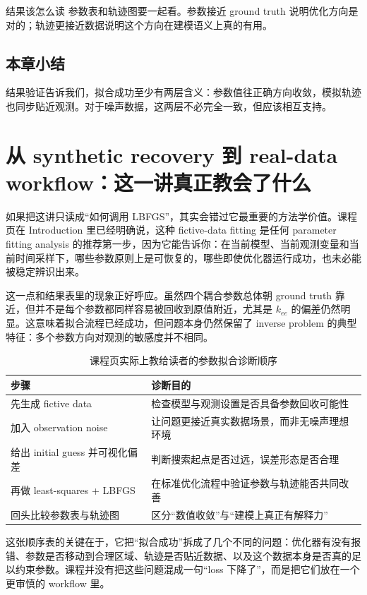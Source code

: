 \documentclass[a4paper]{article}
\begin{document}
\begin{knowledgebox}{结果该怎么读}
参数表和轨迹图要一起看。参数接近 ground truth 说明优化方向是对的；轨迹更接近数据说明这个方向在建模语义上真的有用。
\end{knowledgebox}

\subsection{本章小结}
结果验证告诉我们，拟合成功至少有两层含义：参数值往正确方向收敛，模拟轨迹也同步贴近观测。对于噪声数据，这两层不必完全一致，但应该相互支持。

\section{从 synthetic recovery 到 real-data workflow：这一讲真正教会了什么}
如果把这讲只读成“如何调用 LBFGS”，其实会错过它最重要的方法学价值。课程页在 Introduction 里已经明确说，这种 fictive-data fitting 是任何 parameter fitting analysis 的推荐第一步，因为它能告诉你：在当前模型、当前观测变量和当前时间采样下，哪些参数原则上是可恢复的，哪些即使优化器运行成功，也未必能被稳定辨识出来。

这一点和结果表里的现象正好呼应。虽然四个耦合参数总体朝 ground truth 靠近，但并不是每个参数都同样容易被回收到原值附近，尤其是 $k_{ee}$ 的偏差仍然明显。这意味着拟合流程已经成功，但问题本身仍然保留了 inverse problem 的典型特征：多个参数方向对观测的敏感度并不相同。

\begin{table}[H]
\centering
\caption{课程页实际上教给读者的参数拟合诊断顺序}
\begin{tabular}{p{}p{}}
\toprule
步骤 & 诊断目的 \\
\midrule
先生成 fictive data & 检查模型与观测设置是否具备参数回收可能性 \\
加入 observation noise & 让问题更接近真实数据场景，而非无噪声理想环境 \\
给出 initial guess 并可视化偏差 & 判断搜索起点是否过远，误差形态是否合理 \\
再做 least-squares + LBFGS & 在标准优化流程中验证参数与轨迹能否共同改善 \\
回头比较参数表与轨迹图 & 区分“数值收敛”与“建模上真正有解释力” \\
\bottomrule
\end{tabular}
\end{table}

这张顺序表的关键在于，它把“拟合成功”拆成了几个不同的问题：优化器有没有报错、参数是否移动到合理区域、轨迹是否贴近数据、以及这个数据本身是否真的足以约束参数。课程并没有把这些问题混成一句“loss 下降了”，而是把它们放在一个更审慎的 workflow 里。
\end{document}
